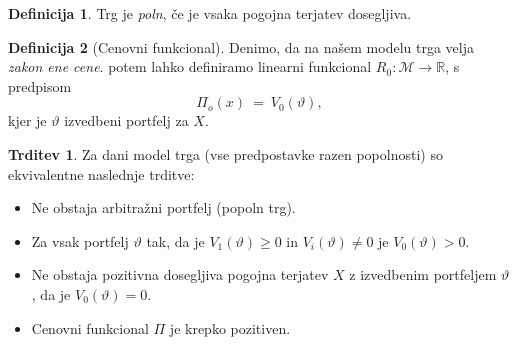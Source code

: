 \documentclass[11pt]{article}
\newcommand{\R}{\mathbb{R}}
\newcommand{\M}{\mathcal{M}}
\theoremstyle{definition}
\newtheorem{definicija}{Definicija}[section]
\theoremstyle{definition}
\newtheorem{trditev}{Trditev}[section]
\begin{document}
\begin{definicija}

Trg je \textit{poln}, če je vsaka pogojna terjatev dosegljiva.

\end{definicija}
\vspace{0.5cm}

\begin{definicija}[Cenovni funkcional]

Denimo, da na našem modelu trga velja \textit{zakon ene cene}. potem lahko definiramo linearni funkcional \hbox{$R_0: \M \rightarrow \R$}, s predpisom 
$$\Pi_o(x) ~=~ V_0(\vartheta),$$
kjer je $\vartheta$ izvedbeni portfelj za $X$.

\end{definicija}
\vspace{0.5cm}

\pagebreak

\begin{trditev}

Za dani model trga (vse predpostavke razen popolnosti) so ekvivalentne naslednje trditve:
\begin{itemize}

	\item Ne obstaja arbitražni portfelj (popoln trg).
	
	\item Za vsak portfelj $\vartheta$ tak, da je $V_1(\vartheta) \geq 0$ in $V_i(\vartheta) \neq 0$ je $V_0(\vartheta) > 0$.
	
	\item Ne obstaja pozitivna dosegljiva pogojna terjatev $X$ z izvedbenim portfeljem $\vartheta$, da je $V_0(\vartheta) = 0$.
	
	\item Cenovni funkcional $\Pi$ je krepko pozitiven.

\end{itemize}

\end{trditev}
\vspace{0.5cm}
\end{document}
